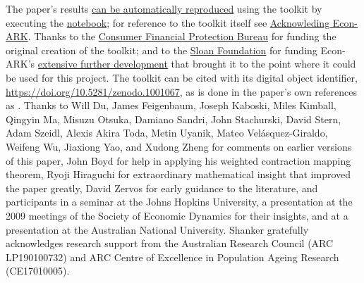 \documentclass[BufferStockTheory]{subfiles}
\begin{document}
\hypersetup{pageanchor=false}  %
  \begin{minipage}{0.9\textwidth} 
    \footnotesize The paper's results \href{https://\owner.github.io/nbreproduce}{can be automatically reproduced} using the {\ARKurl} toolkit by executing the \href{https://econ-ark.org/materials/bufferstocktheory}{notebook}; for reference to the toolkit itself see \href{https://econ-ark.org/acknowledging}{Acknowleding Econ-ARK}.  Thanks to the \href{https://consumerfinance.gov}{Consumer Financial Protection Bureau} for funding the original creation of the {\ARKurl} toolkit; and to the \href{https://sloan.org}{Sloan Foundation} for funding Econ-ARK's \href{https://sloan.org/grant-detail/8071}{extensive further development} that brought it to the point where it could be used for this project.  The toolkit can be cited with its digital object identifier, \href{https://doi.org/10.5281/zenodo.1001067}{https://doi.org/10.5281/zenodo.1001067}, as is done in the paper's own references as \cite{carroll_et_al-proc-scipy-2018}.  Thanks to Will Du, James Feigenbaum, Joseph Kaboski, Miles Kimball, Qingyin Ma, Misuzu Otsuka, Damiano Sandri, John Stachurski, David Stern, Adam Szeidl, Alexis Akira Toda, Metin Uyanik, Mateo Vel\'asquez-Giraldo, Weifeng Wu,  Jiaxiong Yao, and Xudong Zheng for comments on earlier versions of this paper, John Boyd for help in applying his weighted contraction mapping theorem, Ryoji  Hiraguchi for extraordinary mathematical insight that improved the  paper greatly, David Zervos for early guidance to the literature, and participants in a seminar at the Johns Hopkins University, a presentation at the 2009 meetings of the Society of Economic Dynamics for their insights, and at a presentation at the Australian National University. Shanker gratefully acknowledges research support from the Australian Research Council (ARC LP190100732) and ARC Centre of Excellence in Population Ageing Research (CE17010005). 
  \end{minipage} 

  \titlepagefinish\pagebreak
  \let\LaTeXStandardContentsName\contentsname
  \renewcommand{\contentsname}{}
  \tableofcontents
  \pagebreak
  \medskip\medskip
  \begin{minipage}{0.9\textwidth}
    \listoffigures 
  \end{minipage}
\end{document}
